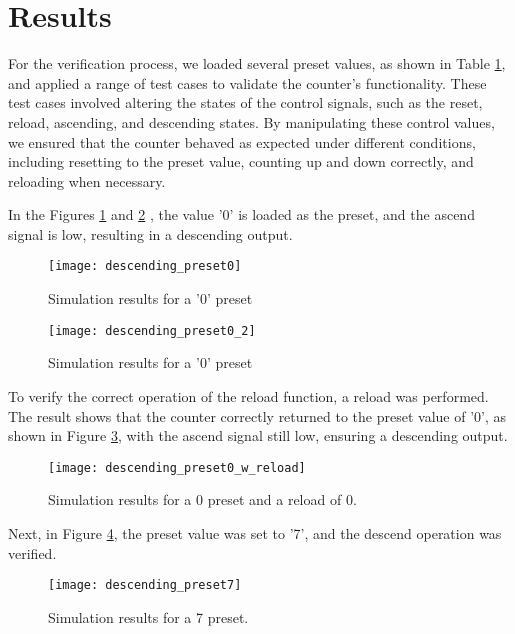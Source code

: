 \documentclass[conference]{IEEEtran}
\begin{document}
	
	\section{Results}
	For the verification process, we loaded several preset values, as shown in Table \ref{}, and applied a range of test cases to validate the counter's functionality. These test cases involved altering the states of the control signals, such as the reset, reload, ascending, and descending states. By manipulating these control values, we ensured that the counter behaved as expected under different conditions, including resetting to the preset value, counting up and down correctly, and reloading when necessary.
	
	In the Figures \ref{fig:descendingpreset0} and \ref{fig:descendingpreset02} , the value '0' is loaded as the preset, and the ascend signal is low, resulting in a descending output.
	\begin{figure}[H]
		\centering
		\texttt{[image: descending\_preset0]}
		\caption{Simulation results for a '0' preset}
		\label{fig:descendingpreset0}
	\end{figure}
	
	\begin{figure}[H]
		\centering
		\texttt{[image: descending\_preset0\_2]}
		\caption{Simulation results for a '0' preset}
		\label{fig:descendingpreset02}
	\end{figure}
	
	To verify the correct operation of the reload function, a reload was performed. The result shows that the counter correctly returned to the preset value of '0', as shown in Figure \ref{fig:descendingpreset0wreload}, with the ascend signal still low, ensuring a descending output.
	
	\begin{figure}[H]
		\centering
		\texttt{[image: descending\_preset0\_w\_reload]}
		\caption{Simulation results for a 0 preset and a reload of 0.}
		\label{fig:descendingpreset0wreload}
	\end{figure}
	
	Next, in Figure \ref{fig:descendingpreset7}, the preset value was set to '7', and the descend operation was verified.
	
	\begin{figure}[H]
		\centering
		\texttt{[image: descending\_preset7]}
		\caption{Simulation results for a 7 preset.}
		\label{fig:descendingpreset7}
	\end{figure}
	
\end{document}
